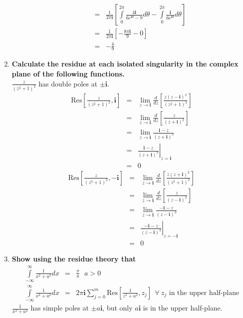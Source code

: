 \documentclass{article}%
\newcommand\Res[1]{\text{Res}{#1}}
\newcommand\I{\textbf{i}}
\begin{document}
\begin{enumerate}
\begin{enumerate}[label=\alph*)]
\begin{eqnarray*}
            &=& \frac{1}{2\pi\I}\left[\int\limits_{0}^{2\pi}{\frac{4\I}{6e^{\I\theta}-9}d\theta}-\int\limits_{0}^{2\pi}{\frac{\I}{6e^{\I\theta}} d\theta}\right] \\
            &=& \frac{1}{2\pi\I}\left[-\frac{8\pi\I}{9}-0\right] \\
            &=& -\frac{4}{9}
        \end{eqnarray*}
    \end{enumerate}
    \item %
    \textbf{Calculate the residue at each isolated singularity in the complex plane of the following functions.}\\
    $\frac{z}{(z^2+1)^2}$ has double poles at $\pm\I$.
    \begin{eqnarray*}
        \Res{\left[\frac{z}{(z^2+1)^2}, \I\right]} &=& \lim_{z\to\I}{\frac{d}{dz}\left[\frac{z(z-\I)^2}{(z^2+1)^2}\right]} \\
            &=& \lim_{z\to\I}{\frac{d}{dz}\left[\frac{z}{(z+\I)^2}\right]} \\
            &=& \lim_{z\to\I}{\frac{\I-z}{(z+\I)^3}} \\
            &=& \left.{\frac{\I-z}{(z+\I)^3}}\right|_{z=\I} \\
            &=& 0
    \end{eqnarray*}
    \begin{eqnarray*}
        \Res{\left[\frac{z}{(z^2+1)^2}, -\I\right]} &=& \lim_{z\to\I}{\frac{d}{dz}\left[\frac{z(z+\I)^2}{(z^2+1)^2}\right]} \\
            &=& \lim_{z\to\I}{\frac{d}{dz}\left[\frac{z}{(z-\I)^2}\right]} \\
            &=& \lim_{z\to\I}{\frac{-\I-z}{(z-\I)^3}} \\
            &=& \left.{\frac{-\I-z}{(z-\I)^3}}\right|_{z=-\I} \\
            &=& 0
    \end{eqnarray*}
    \item %
    \textbf{Show using the residue theory that}
    \begin{eqnarray*}
        \int\limits_{-\infty}^{\infty}{\frac{1}{x^2+a^2}dx} &=& \frac{\pi}{a}~~~a>0 \\
        \int\limits_{-\infty}^{\infty}{\frac{1}{x^2+a^2}dx} &=& 2\pi\I\sum\limits_{j=0}^{m}\Res{\left[\frac{1}{z^2+a^2},z_j\right]} 
            ~~\forall~z_j\text{ in the upper half-plane}
    \end{eqnarray*}
    $\frac{1}{x^2+a^2}$ has simple poles at $\pm a\I$, but only $a\I$ is in the upper half-plane.

\end{enumerate}
\end{document}

